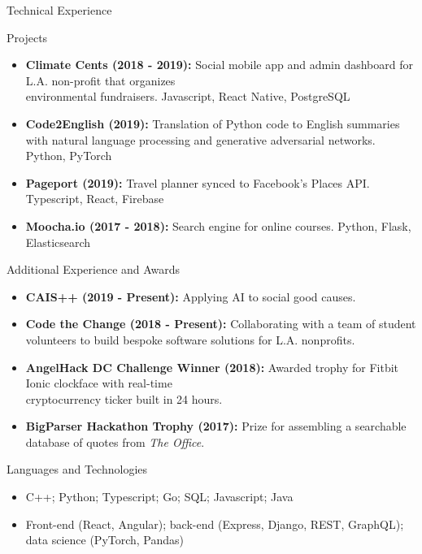 \documentclass[calibri]{mcdowellcv}
\begin{document}
	\begin{cvsection}{Technical Experience}
		\begin{cvsubsection}{Projects}{}{}
			\begin{itemize}
				\item \textbf{Climate Cents (2018 - 2019):} Social mobile app and admin dashboard for L.A. non-profit that organizes\\ environmental fundraisers. Javascript, React Native, PostgreSQL
				\item \textbf{Code2English (2019):} Translation of Python code to English summaries with natural language processing and generative adversarial networks. Python, PyTorch
				\item \textbf{Pageport (2019):} Travel planner synced to Facebook's Places API. Typescript, React, Firebase
				\item \textbf{Moocha.io (2017 - 2018):} Search engine for online courses. Python, Flask, Elasticsearch
			\end{itemize}
		\end{cvsubsection}
	\end{cvsection}

	\begin{cvsection}{Additional Experience and Awards}
		\begin{cvsubsection}{}{}{}
			\begin{itemize}
				\item \textbf{CAIS++ (2019 - Present):} Applying AI to social good causes.
				\item \textbf{Code the Change (2018 - Present):} Collaborating with a team of student volunteers to build bespoke software solutions for L.A. nonprofits.
				\item \textbf{AngelHack DC Challenge Winner (2018):} Awarded trophy for Fitbit Ionic clockface with real-time \\cryptocurrency ticker built in 24 hours.
				\item \textbf{BigParser Hackathon Trophy (2017):} Prize for assembling a searchable database of quotes from \textit{The Office}.
			\end{itemize}
		\end{cvsubsection}
	\end{cvsection}

	\begin{cvsection}{Languages and Technologies}
		\begin{cvsubsection}{}{}{}
			\begin{itemize}
				\item C++; Python; Typescript; Go; SQL; Javascript; Java
				\item Front-end (React, Angular); back-end (Express, Django, REST, GraphQL); data science (PyTorch, Pandas)
			\end{itemize}
		\end{cvsubsection}
	\end{cvsection}
\end{document}
